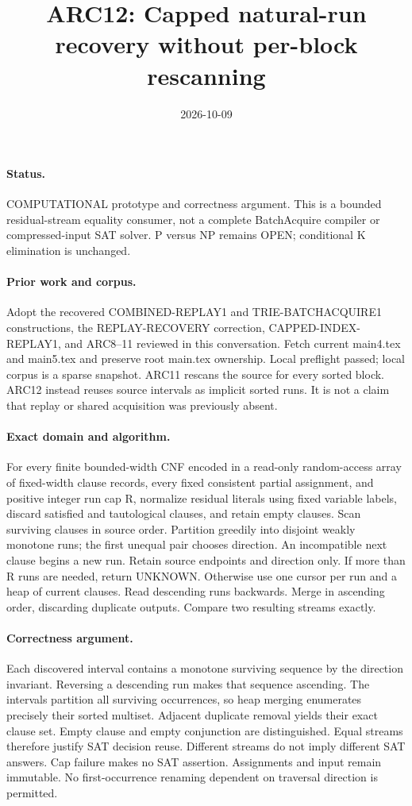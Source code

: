 \documentclass{article}
\title{ARC12: Capped natural-run recovery without per-block rescanning}
\date{2026-10-09}
\begin{document}
\maketitle
\paragraph{Status.} COMPUTATIONAL prototype and correctness argument.
This is a bounded residual-stream equality consumer, not a complete
BatchAcquire compiler or compressed-input SAT solver. P versus NP remains
OPEN; conditional K elimination is unchanged.

\paragraph{Prior work and corpus.}
Adopt the recovered COMBINED-REPLAY1 and TRIE-BATCHACQUIRE1 constructions,
the REPLAY-RECOVERY correction, CAPPED-INDEX-REPLAY1, and ARC8--11 reviewed
in this conversation. Fetch current main4.tex and main5.tex and preserve
root main.tex ownership. Local preflight passed; local corpus is a sparse
snapshot. ARC11 rescans the source for every sorted block. ARC12 instead
reuses source intervals as implicit sorted runs. It is not a claim that
replay or shared acquisition was previously absent.

\paragraph{Exact domain and algorithm.}
For every finite bounded-width CNF encoded in a read-only random-access
array of fixed-width clause records, every fixed consistent partial
assignment, and positive integer run cap R, normalize residual literals
using fixed variable labels, discard satisfied and tautological clauses,
and retain empty clauses. Scan surviving clauses in source order.
Partition greedily into disjoint weakly monotone runs; the first unequal
pair chooses direction. An incompatible next clause begins a new run.
Retain source endpoints and direction only. If more than R runs are needed,
return UNKNOWN. Otherwise use one cursor per run and a heap of current
clauses. Read descending runs backwards. Merge in ascending order,
discarding duplicate outputs. Compare two resulting streams exactly.

\paragraph{Correctness argument.}
Each discovered interval contains a monotone surviving sequence by the
direction invariant. Reversing a descending run makes that sequence
ascending. The intervals partition all surviving occurrences, so heap
merging enumerates precisely their sorted multiset. Adjacent duplicate
removal yields their exact clause set. Empty clause and empty conjunction
are distinguished. Equal streams therefore justify SAT decision reuse.
Different streams do not imply different SAT answers.
Cap failure makes no SAT assertion. Assignments and input remain immutable.
No first-occurrence renaming dependent on traversal direction is permitted.
\end{document}
